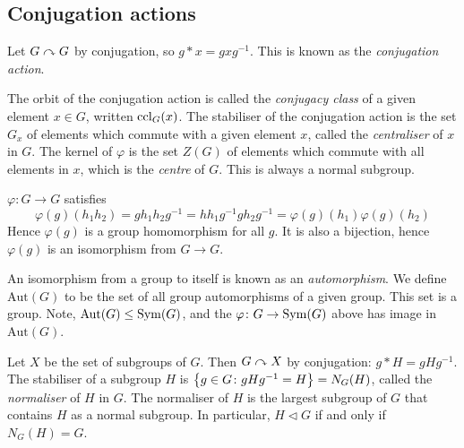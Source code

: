 \subsection{Conjugation actions}
\begin{example}
	Let \( G \curvearrowright G \) by conjugation, so \( g \ast x = g x g^{-1} \).
	This is known as the \textit{conjugation action}.
\end{example}
\begin{definition}
	The orbit of the conjugation action is called the \textit{conjugacy class} of a given element \( x \in G \), written \( \operatorname{ccl}_G(x) \).
	The stabiliser of the conjugation action is the set \( G_x \) of elements which commute with a given element \( x \), called the \textit{centraliser} of \( x \) in \( G \).
	The kernel of \( \varphi \) is the set \( Z(G) \) of elements which commute with all elements in \( x \), which is the \textit{centre} of \( G \).
	This is always a normal subgroup.
\end{definition}
\begin{remark}
	\( \varphi \colon G \to G \) satisfies
	\[ \varphi(g)(h_1 h_2) = g h_1 h_2 g^{-1} = h h_1 g^{-1} g h_2 g^{-1} = \varphi(g)(h_1) \varphi(g)(h_2) \]
	Hence \( \varphi(g) \) is a group homomorphism for all \( g \).
	It is also a bijection, hence \( \varphi(g) \) is an isomorphism from \( G \to G \).
\end{remark}
\begin{definition}
	An isomorphism from a group to itself is known as an \textit{automorphism}.
	We define \( \mathrm{Aut}(G) \) to be the set of all group automorphisms of a given group.
	This set is a group.
	Note, \( \mathrm{Aut}(G) \leq \operatorname{Sym}(G) \), and the \( \varphi \colon G \to \operatorname{Sym}(G) \) above has image in \( \mathrm{Aut}(G) \).
\end{definition}
\begin{example}
	Let \( X \) be the set of subgroups of \( G \).
	Then \( G \curvearrowright X \) by conjugation: \( g \ast H = g H g^{-1} \).
	The stabiliser of a subgroup \( H \) is \( \qty{ g \in G \colon gHg^{-1} = H } = N_G(H) \), called the \textit{normaliser} of \( H \) in \( G \).
	The normaliser of \( H \) is the largest subgroup of \( G \) that contains \( H \) as a normal subgroup.
	In particular, \( H \triangleleft G \) if and only if \( N_G(H) = G \).
\end{example}
